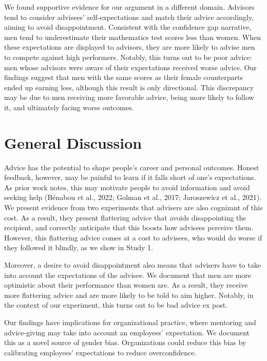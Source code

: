 \documentclass[
  man,
  floatsintext,
  longtable,
  nolmodern,
  notxfonts,
  notimes,
  colorlinks=true,linkcolor=blue,citecolor=blue,urlcolor=blue]{apa7}
\begin{document}
We found supportive evidence for our argument in a different domain.
Advisors tend to consider advisees' self-expectations and match their
advice accordingly, aiming to avoid disappointment. Consistent with the
confidence gap narrative, men tend to underestimate their mathematics
test scores less than women. When these expectations are displayed to
advisors, they are more likely to advise men to compete against high
performers. Notably, this turns out to be poor advice: men whose
advisors were aware of their expectations received worse advice. Our
findings suggest that men with the same scores as their female
counterparts ended up earning less, although this result is only
directional. This discrepancy may be due to men receiving more favorable
advice, being more likely to follow it, and ultimately facing worse
outcomes.

\section{General Discussion}\label{general-discussion}

Advice has the potential to shape people's career and personal outcomes.
Honest feedback, however, may be painful to learn if it falls short of
one's expectations. As prior work notes, this may motivate people to
avoid information and avoid seeking help (Bénabou et al., 2022; Golman
et al., 2017; Jaroszewicz et al., 2021). We present evidence from two
experiments that advisers are also cognizant of this cost. As a result,
they present flattering advice that avoids disappointing the recipient,
and correctly anticipate that this boosts how advisees perceive them.
However, this flattering advice comes at a cost to advisees, who would
do worse if they followed it blindly, as we show in Study 1.

Moreover, a desire to avoid disappointment also means that advisers have
to take into account the expectations of the advisee. We document that
men are more optimistic about their performance than women are. As a
result, they receive more flattering advice and are more likely to be
told to aim higher. Notably, in the context of our experiment, this
turns out to be bad advice ex post.

Our findings have implications for organizational practice, where
mentoring and advice-giving may take into account an employees'
expectation. We document this as a novel source of gender bias.
Organizations could reduce this bias by calibrating employees'
expectations to reduce overconfidence.
\end{document}
